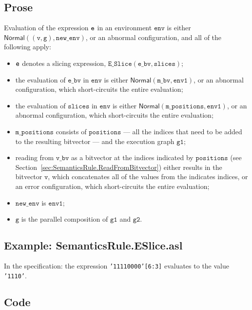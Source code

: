 \documentclass{book}
\newcommand\secref[1]{Section~\ref{sec:#1}}
\newcommand\ProseOrAbnormal[0]{or an abnormal configuration, which short-circuits the entire evaluation}
\newcommand\ProseOrError[0]{or an error configuration, which short-circuits the entire evaluation}
\newcommand\Normal[0]{\textsf{Normal}}
\newcommand\newenv[0]{\texttt{new\_env}}
\newcommand\env[0]{\texttt{env}}
\newcommand\envone[0]{\texttt{env1}}
\newcommand\vg[0]{\texttt{g}}
\newcommand\vv[0]{\texttt{v}}
\newcommand\vgone[0]{\texttt{g1}}
\newcommand\vgtwo[0]{\texttt{g2}}
\newcommand\ebv[0]{\texttt{e\_bv}}
\newcommand\mbv[0]{\texttt{m\_bv}}
\newcommand\vbv[0]{\texttt{v\_bv}}
\newcommand\mpositions[0]{\texttt{m\_positions}}
\newcommand\slices[0]{\texttt{slices}}
\newcommand\positions[0]{\texttt{positions}}
\begin{document}
  \subsection{Prose}
  Evaluation of the expression $\texttt{e}$ in an environment $\env$ is either $\Normal((\vv, \vg), \newenv)$,
  or an abnormal configuration, and all of the following apply:
  \begin{itemize}
    \item $\texttt{e}$ denotes a slicing expression, $\texttt{E\_Slice}(\ebv, \slices)$;
    \item the evaluation of $\ebv$ in $\env$ is either $\Normal(\mbv, \envone)$,
    \ProseOrAbnormal;
    \item the evaluation of $\slices$ in $\env$ is either $\Normal(\mpositions, \envone)$,
    \ProseOrAbnormal;
    \item $\mpositions$ consists of $\positions$ --- all the indices that need to be added to the
    resulting bitvector --- and the execution graph $\vgone$;
    \item reading from $\vbv$ as a bitvector at the indices indicated by $\positions$
    (see \secref{SemanticsRule.ReadFromBitvector}) either results in the bitvector $\vv$,
    which concatenates all of the values from the indicates indices,
    \ProseOrError;
    \item $\newenv$ is $\envone$;
    \item $\vg$ is the parallel composition of $\vgone$ and $\vgtwo$.
  \end{itemize}

  \subsection{Example: SemanticsRule.ESlice.asl}
    In the specification:
    the expression \texttt{'11110000'[6:3]} evaluates to the value \texttt{'1110'}.

  \subsection{Code}
\end{document}
